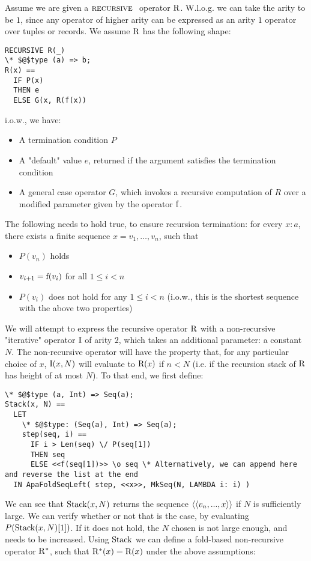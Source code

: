 Assume we are given a $\textsc{recursive }$ operator $\mathrm{R}$. W.l.o.g. we can take the arity to be $1$, since any operator of higher arity can be expressed as an arity $1$ operator over tuples or records.
We assume $\mathrm{R}$ has the following shape:
\begin{lstlisting}[language=tla,columns=fullflexible]
RECURSIVE R(_)
\* $@$type (a) => b;
R(x) ==
  IF P(x)
  THEN e
  ELSE G(x, R(f(x))
\end{lstlisting}
%
i.o.w., we have:
\begin{itemize}
  \item A termination condition $P$
  \item A "default" value $e$, returned if the argument satisfies the termination condition
  \item A general case operator $G$, which invokes a recursive computation of $R$ over a modified parameter given by the operator $\mathrm{f}$.
\end{itemize}
%
The following needs to hold true, to ensure recursion termination: for every $x\colon a$, there exists a finite sequence $x = v_1, \dots, v_n$, such that
\begin{itemize}
\item $P(v_n)$ holds
\item $v_{i+1} = \mathrm{f}(v_i)$ for all $1 \le i < n$
\item $P(v_i)$ does not hold for any $1 \le i < n$ (i.o.w., this is the shortest sequence with the above two properties)
\end{itemize}
%
We will attempt to express the recursive operator $\mathrm{R}$ with a non-recursive "iterative" operator $\mathrm{I}$ of arity $2$, which takes an additional parameter: a constant $N$. The non-recursive operator will have the property that, for any particular choice of $x$, $\mathrm{I}(x, N)$ will evaluate to $\mathrm{R}(x)$ if $n < N$ (i.e. if the recursion stack of $\mathrm{R}$ has height of at most $N$).
%
To that end, we first define:
\begin{lstlisting}[language=tla,columns=fullflexible]
\* $@$type (a, Int) => Seq(a);
Stack(x, N) ==
  LET 
    \* $@$type: (Seq(a), Int) => Seq(a);
    step(seq, i) ==
      IF i > Len(seq) \/ P(seq[1])
      THEN seq
      ELSE <<f(seq[1])>> \o seq \* Alternatively, we can append here and reverse the list at the end
  IN ApaFoldSeqLeft( step, <<x>>, MkSeq(N, LAMBDA i: i) )
\end{lstlisting}
%
We can see that $\mathrm{Stack}(x,N)$ returns the sequence $\left<\left<v_n, ..., x\right>\right>$ if $N$ is sufficiently large. We can verify whether or not that is the case, by evaluating $P(\mathrm{Stack}(x, N)[1])$. If it does not hold, the $N$ chosen is not large enough, and needs to be increased. Using $\mathrm{Stack}$ we can define a fold-based non-recursive operator $\mathrm{R}^*$, such that $\mathrm{R}^*(x) = \mathrm{R}(x)$ under the above assumptions:

